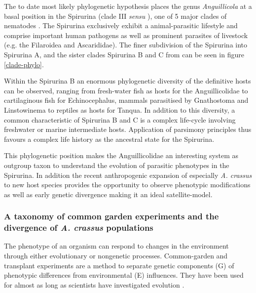 The to date most likely phylogenetic hypothesis places the genus
\textit{Anguillicola} at a basal position in the Spirurina (clade III
\textit{sensu} \cite{blaxter_molecular_1998}), one of 5 major clades
of nematodes \cite{nadler_molecular_2007,
  wijov_evolutionary_2006}. The Spirurina exclusively exhibit a
animal-parasitic lifestyle and comprise important human pathogens as
well as prominent parasites of livestock (e.g. the Filaroidea and
Ascarididae). The finer subdivision of the Spirurina into Spirurina A,
and the sister clades Spirurina B and C from \cite{dl_py} can be seen
in figure \ref{clade-phylo}.


Within the Spirurina B an enormous phylogenetic diversity of the
definitive hosts can be observed, ranging from fresh-water fish as
hosts for the Anguillicolidae to cartilaginous fish for
Echinocephalus, mammals parasitised by Gnathostoma and Linstowinema to
reptiles as hosts for Tanqua. In addition to this diversity, a common
characteristic of Spirurina B and C is a complex life-cycle involving
freshwater or marine intermediate hosts. Application of parsimony
principles thus favours a complex life history as the ancestral state
for the Spirurina.

This phylogenetic position makes the Anguillicolidae an interesting
system as outgroup taxon to understand the evolution of parasitic
phenotypes in the Spirurina. In addition the recent anthropogenic
expansion of especially \textit{A. crassus} to new host species
provides the opportunity to observe phenotypic modifications as well
as early genetic divergence making it an ideal satellite-model.

\subsubsection{A taxonomy of common garden experiments and the
  divergence of \textit{A. crassus} populations}
\label{div-ac}

The phenotype of an organism can respond to changes in the environment
through either evolutionary or nongenetic processes. Common-garden and
transplant experiments are a method to separate genetic components (G)
of phenotypic differences from environmental (E) influences. They have
been used for almost as long as scientists have investigated evolution
\cite{kerner_classic_common_garden, bonnier_classic_common_garden}.

